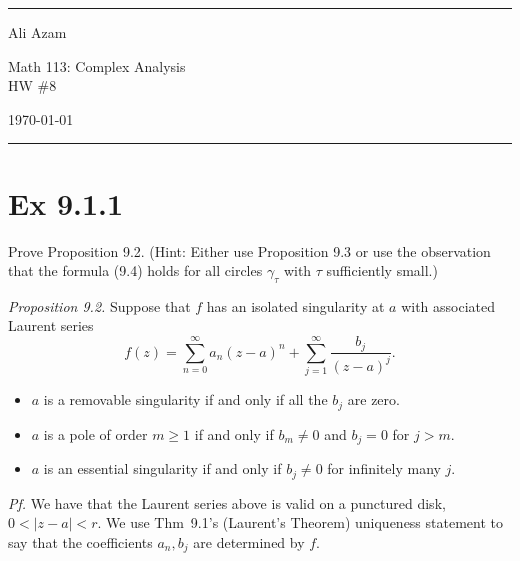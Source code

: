 \documentclass[a4paper]{article}
\begin{document}
\hrule\medskip
\begin{minipage}{0.295\textwidth}\raggedright\footnotesize
Ali Azam
\end{minipage}%
\begin{minipage}{0.4\textwidth}\centering
\large Math 113: Complex Analysis\\
\normalsize HW \#8
\end{minipage}%
\begin{minipage}{0.295\textwidth}\raggedleft
\today
\end{minipage}
\medskip\hrule\bigskip

\section*{Ex 9.1.1}

\begin{prob}
Prove Proposition 9.2. (Hint: Either use Proposition 9.3 or use the observation
that the formula (9.4) holds for all circles $\gamma_\tau$ with $\tau$
sufficiently small.)

\medskip
\emph{Proposition 9.2.} Suppose that $f$ has an isolated singularity at $a$ with
associated Laurent series
\[
f(z)=\sum_{n=0}^{\infty}a_n(z-a)^n+\sum_{j=1}^{\infty}\frac{b_j}{(z-a)^j}.
\]
\begin{itemize}
\item[(a)] $a$ is a removable singularity if and only if all the $b_j$ are zero.
\item[(b)] $a$ is a pole of order $m\ge 1$ if and only if $b_m\ne 0$ and $b_j=0$
for $j>m$.
\item[(c)] $a$ is an essential singularity if and only if $b_j\ne 0$ for
infinitely many $j$.
\end{itemize}
\end{prob}

\textit{Pf.} We have that the Laurent series above is valid on a punctured disk, $0<|z-a|<r$. We use Thm~9.1's (Laurent's Theorem) uniqueness statement to say that the coefficients $a_n,b_j$ are determined by $f$.

\medskip
\end{document}
